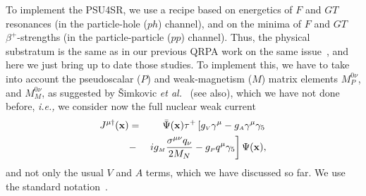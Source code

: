 \documentclass[nofootinbib,twocolumn,eqsecnum,floats,aps]{revtex4}
\def\sss{\scriptscriptstyle}
\def\xb {{\bf x}}
\def\nn{\nonumber }
\def\ie{{\it i.e., }}
\def\nn{\nonumber }
\def\br{\begin{eqnarray}}
\def\er{\end{eqnarray}}
\def\xb {{\bf x}}
\def\etal {{\it et al.}}
\def\b {{\beta}}
\def\sss{\scriptscriptstyle}
\begin{document}
To implement the PSU4SR, we use a recipe
based on  energetics of $F$ and $GT$
resonances (in the particle-hole ($ph$) channel), and on the minima
of $F$ and $GT$ $\b^+$-strengths (in the particle-particle ($pp$)
channel). Thus, the physical substratum is the same as in our
previous QRPA work on the same
issue~\cite{Krm90,Hir90,Hir90a,Hir90b,Krm92,Krm93,Krm93a,Krm94,Krm94a,Krm97,Bar98,Bar99a,Bar99,Fer16},
and here we just bring up to date those studies.  To implement
this, we have to take into account
the pseudoscalar ($P$) and weak-magnetism ($M$) matrix elements
$M_{P}^{0\nu}$, and $M_{M}^{0\nu}$, as suggested by
\v Simkovic \etal~\cite{Sim99} (see also\cite[Appendix A]{Sim08}), which we have not done before,
\ie   we consider now the full nuclear weak current
\br
J^{\mu\dagger}(\xb)&=&\bar{\Psi}(\xb)\tau^+
\left[g_{\sss V}\gamma^\mu-g_{\sss A}\gamma^\mu\gamma_5
\right.
\nn\\
&-&\left.ig_{\sss M}\frac{\sigma^{\mu\nu}q_\nu}{2M_N}
-g_{\sss P}q^\mu\gamma_5\right]\Psi(\xb),
\label{1.1}\er
and not only the  usual $V$ and
$A$ terms, which we have discussed so far.
We use the standard notation~\cite{Sim99,Sim08,Bar98,Bar99a}.
\end{document}
